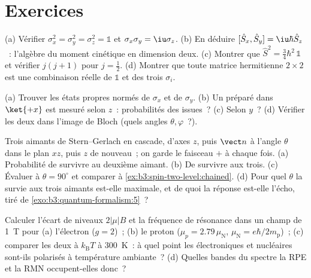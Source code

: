 \section{Exercices}

\begin{exercise}[$\star$]\label{exo:b3:spin-two-level:1}
(a) Vérifier $\sigma_x^2 = \sigma_y^2 = \sigma_z^2 = \mathbb 1$ et
$\sigma_x\sigma_y = \iu\sigma_z$. (b) En déduire $[\hat S_x, \hat S_y]
= \iu\hbar\hat S_z$~: l'algèbre du moment cinétique en dimension deux.
(c) Montrer que $\hat S^2 = \tfrac34\hbar^2\,\mathbb 1$ et vérifier
$j(j+1)$ pour $j = \tfrac12$. (d) Montrer que toute matrice
hermitienne $2\times2$ est une combinaison réelle de $\mathbb 1$ et
des trois $\sigma_i$.
\end{exercise}

\begin{exercise}[$\star$]\label{exo:b3:spin-two-level:2}
(a) Trouver les états propres normés de $\sigma_x$ et de $\sigma_y$.
(b) Un  préparé dans $\ket{+x}$ est mesuré selon $z$~:
probabilités des issues~? (c) Selon $y$~? (d) Vérifier les deux dans
l'image de Bloch (quels angles $\theta, \varphi$~?).
\end{exercise}

\begin{exercise}[$\star$]\label{exo:b3:spin-two-level:3}
Trois aimants de Stern--Gerlach en cascade, d'axes $z$, puis $\vect n$
à l'angle $\theta$ dans le plan $xz$, puis $z$ de nouveau~; on garde
le faisceau $+$ à chaque fois. (a) Probabilité de survivre au deuxième
aimant. (b) De survivre aux trois. (c) Évaluer à $\theta = 90^\circ$
et comparer à \cref{ex:b3:spin-two-level:chained}. (d) Pour quel
$\theta$ la survie aux trois aimants est-elle maximale, et de quoi la
réponse est-elle l'écho, tiré de \cref{exo:b3:quantum-formalism:5}~?
\end{exercise}

\begin{exercise}[$\star$]\label{exo:b3:spin-two-level:4}
Calculer l'écart de niveaux $2|\mu|B$ et la fréquence de résonance
dans un champ de \qty{1}{T} pour (a) l'électron ($g = 2$)~; (b) le
proton ($\mu_p = 2.79\,\mu_{\text{N}}$, $\mu_{\text{N}} =
e\hbar/2m_{\text{p}}$)~; (c) comparer les deux à $k_{\text{B}}T$ à
\qty{300}{K}~: à quel point les  électroniques et nucléaires
sont-ils polarisés à température ambiante~? (d) Quelles bandes du
spectre la RPE et la RMN occupent-elles donc~?
\end{exercise}

